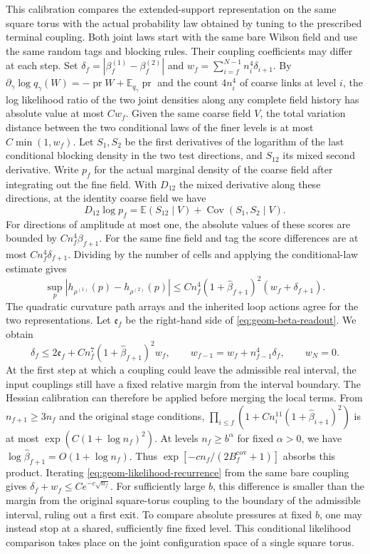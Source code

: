 \documentclass[11pt,a4paper]{article}
\numberwithin{equation}{section}
\begin{document}
This calibration compares the extended-support representation on the same square torus with the actual probability law obtained by tuning to the prescribed terminal coupling. Both joint laws start with the same bare Wilson field and use the same random tags and blocking rules. Their coupling coefficients may differ at each step. Set
\(\delta_f=|\beta_f^{(1)}-\beta_f^{(2)}|\) and
\(w_f=\sum_{i=f}^{N-1}n_i^4\delta_{i+1}\).
By \(\partial_\gamma\log q_\gamma(W)=-\operatorname{pr}W+\mathbb E_{q_\gamma}\operatorname{pr}\) and the count \(4n_i^4\) of coarse links at level \(i\), the log likelihood ratio of the two joint densities along any complete field history has absolute value at most \(Cw_f\). Given the same coarse field \(V\), the total variation distance between the two conditional laws of the finer levels is at most \(C\min(1,w_f)\). Let \(S_1,S_2\) be the first derivatives of the logarithm of the last conditional blocking density in the two test directions, and \(S_{12}\) its mixed second derivative. Write \(p_f\) for the actual marginal density of the coarse field after integrating out the fine field. With \(D_{12}\) the mixed derivative along these directions, at the identity coarse field we have
\[
 D_{12}\log p_f=\mathbb E(S_{12}\mid V)
                  +\operatorname{Cov}(S_1,S_2\mid V).
\]
For directions of amplitude at most one, the absolute values of these scores are bounded by \(C n_f^4\beta_{f+1}\). For the same fine field and tag the score differences are at most \(C n_f^4\delta_{f+1}\). Dividing by the number of cells and applying the conditional-law estimate gives
\[
 \sup_p|h_{\rho^{(1)}}(p)-h_{\rho^{(2)}}(p)|
 \le C n_f^4(1+\widehat\beta_{f+1})^2(w_f+\delta_{f+1}).
\]
The quadratic curvature path arrays and the inherited loop actions agree for the two representations. Let \(\mathfrak e_f\) be the right-hand side of \eqref{eq:geom-beta-readout}. We obtain
\begin{equation}
 \delta_f\le2\mathfrak e_f+C n_f^7(1+\widehat\beta_{f+1})^2 w_f,\qquad
 w_{f-1}=w_f+n_{f-1}^4\delta_f,\qquad w_N=0 .
 \label{eq:geom-likelihood-recurrence}
\end{equation}
At the first step at which a coupling could leave the admissible real interval, the input couplings still have a fixed relative margin from the interval boundary. The Hessian calibration can therefore be applied before merging the local terms. From \(n_{f+1}\ge3n_f\) and the original stage conditions,
\(\prod_{i\le f}(1+C n_i^{11}(1+\widehat\beta_{i+1})^2)\)
is at most \(\exp(C(1+\log n_f)^2)\). At levels \(n_f\ge b^\alpha\) for fixed \(\alpha>0\), we have \(\log\widehat\beta_{f+1}=O(1+\log n_f)\). Thus \(\exp[-c n_f/(2B_f^{\mathrm{cov}}+1)]\) absorbs this product. Iterating \eqref{eq:geom-likelihood-recurrence} from the same bare coupling gives \(\delta_f+w_f\le C e^{-c\sqrt{n_f}}\). For sufficiently large \(b\), this difference is smaller than the margin from the original square-torus coupling to the boundary of the admissible interval, ruling out a first exit. To compare absolute pressures at fixed \(b\), one may instead stop at a shared, sufficiently fine fixed level. This conditional likelihood comparison takes place on the joint configuration space of a single square torus.
\end{document}
